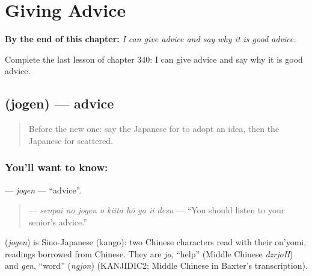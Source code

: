 
\chapter{Giving Advice}
\label{ch:ja-giving-advice}

\begin{chapteropening}
\textbf{By the end of this chapter:} \emph{I can give advice and say why it is good advice.}

Complete the last lesson of chapter 340: I can give advice and say why it is good advice.
\end{chapteropening}

\section[\texorpdfstring{\ja{じょげん} (jogen)}{じょげん (jogen)}]{ (jogen) — advice}

\label{lesson:JA-C340-jogen}



\begin{quote}
Before the new one: say the Japanese for to adopt an idea, then the Japanese for scattered.
\end{quote}

\subsection*{You'll want to know: }
\textbf{} — \emph{jogen} — \textquotedblleft{}advice\textquotedblright{}.

\begin{quote}
\textbf{    } — \emph{senpai no jogen o kiita hō ga ii desu} — \textquotedblleft{}You should listen to your senior's advice.\textquotedblright{}
\end{quote}

\begin{cousinweb}
\textbf{} (\emph{jogen}) is Sino-Japanese (kango): two Chinese characters read with their on'yomi, readings borrowed from Chinese. They are \emph{jo}, \textquotedblleft{}help\textquotedblright{} (Middle Chinese \emph{dzrjoH}) and \emph{gen}, \textquotedblleft{}word\textquotedblright{} (\emph{ngjon}) (KANJIDIC2; Middle Chinese in Baxter's transcription).
\end{cousinweb}

